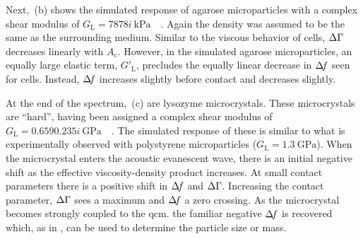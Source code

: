Next, \,(b) shows the simulated response of agarose
microparticles with a complex shear modulus of
$G_\mathrm{L}=\SI{78+78i}{\kilo\pascal}$~\cite{yao1999situ}~\cite{dimitriadis2002determination}.
Again the density was assumed to be the same as the surrounding medium.
Similar to the viscous behavior of cells, $\Delta\Gamma$ decreases linearly with
$A_\mathrm{c}$.  However, in the simulated agarose microparticles, an
equally large elastic term, $G'_\mathrm{L}$, precludes the equally linear
decrease in $\Delta\!f$ seen for cells.  Instead, $\Delta\!f$ increases slightly before
contact and decreases slightly.

At the end of the spectrum, \,(c) are lysozyme
microcrystals.  These microcrystals are ``hard'', having been assigned a
complex shear modulus of
$G_\mathrm{L}=\SI{0.659+0.235i}{\giga\pascal}$~\cite{zamiri2009modeling}~\cite{guo2008investigation}.
The simulated response of these is similar to what is experimentally
observed with polystyrene microparticles
($G_\mathrm{L}=\SI{1.3}{\giga\pascal}$).  When the microcrystal enters the
acoustic evanescent wave, there is an initial negative shift as the
effective viscosity-density product increases.  At small contact parameters
there is a positive shift in $\Delta\!f$ and $\Delta\Gamma$.  Increasing the contact
parameter, $\Delta\Gamma$ sees a maximum and $\Delta\!f$ a zero crossing.  As the
microcrystal becomes strongly coupled to the \gls{qcm}. the familiar negative
$\Delta\!f$ is recovered which, as in , can be used to
determine the particle size or mass.
